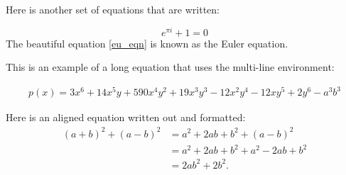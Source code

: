 \documentclass{article}
\begin{document}
Here is another set of equations that are written:

\begin{equation} \label{eu_eqn}
    e^{\pi i} + 1 = 0
\end{equation}
\noindent
The beautiful equation \ref{eu_eqn} is known as the Euler equation.



\noindent
This is an example of a long equation that uses the multi-line environment:

\begin{multline*}
    p(x) = 3x^6 + 14x^5y + 590x^4y^2 + 19x^3y^3
    - 12x^2y^4 - 12xy^5 + 2y^6 - a^3b^3
\end{multline*}

\noindent
Here is an aligned equation written out and formatted:
\begin{align*}
    (a + b)^2 + (a - b)^2 &= a^2 + 2ab + b^2 + (a - b)^2 \\
    &= a^2 + 2ab + b^2 + a^2 - 2ab + b^2 \\
    &= 2ab^2 + 2b^2.
\end{align*}
\end{document}
